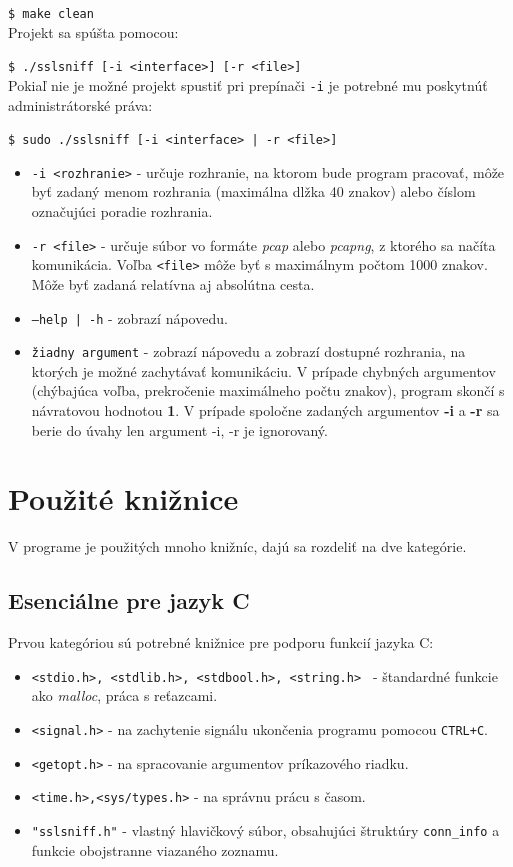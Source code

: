 \documentclass[11pt, a4paper]{article}
\begin{document}
\texttt{\$ make clean}\\
Projekt sa spúšta pomocou:

\texttt{\$ ./sslsniff [-i <interface>] [-r <file>]}\\
Pokiaľ nie je možné projekt spustiť pri prepínači \texttt{-i} je potrebné mu poskytnúť administrátorské práva:
\label{vstupne argumenty}

\texttt{\$ sudo ./sslsniff [-i <interface> | -r <file>]}\\
\begin{itemize}
\item \texttt{-i <rozhranie>} - určuje rozhranie, na ktorom bude program pracovať, môže byť zadaný menom rozhrania (maximálna dlžka 40 znakov) alebo číslom označujúci poradie rozhrania. 
\item \texttt{-r <file>} - určuje súbor vo formáte \emph{pcap} alebo \emph{pcapng}, z ktorého sa načíta komunikácia. Voľba \texttt{<file>} môže byť s maximálnym počtom 1000 znakov. Môže byť zadaná relatívna aj absolútna cesta. 
\item \texttt{--help |\,-h} - zobrazí nápovedu.
\item \texttt{žiadny argument} - zobrazí nápovedu a zobrazí dostupné rozhrania, na ktorých je možné zachytávať komunikáciu.
V prípade chybných argumentov (chýbajúca voľba, prekročenie maximálneho počtu znakov), program skončí s návratovou hodnotou \textbf{1}. 
V prípade spoločne zadaných argumentov \textbf{-i} a \textbf{-r} sa berie do úvahy len argument -i, -r je ignorovaný.
\end{itemize}
	\newpage
	\section{Použité knižnice}
	V programe je použitých mnoho knižníc, dajú sa rozdeliť na dve kategórie. 

	\subsection{Esenciálne pre jazyk C}
	Prvou kategóriou sú potrebné knižnice pre podporu funkcií jazyka C:
	\begin{itemize}
	\item \texttt{<stdio.h>, <stdlib.h>, <stdbool.h>, <string.h> } - štandardné funkcie ako \emph{malloc}, práca s reťazcami.
	\item \texttt{<signal.h>} - na zachytenie signálu ukončenia programu pomocou \texttt{CTRL+C}.
	\item \texttt{<getopt.h>} - na spracovanie argumentov príkazového riadku.
	\item	\texttt{<time.h>,<sys/types.h>} - na správnu prácu s časom.	
	\item \texttt{"sslsniff.h"} - vlastný hlavičkový súbor, obsahujúci štruktúry \texttt{conn\_info} a funkcie obojstranne viazaného zoznamu.
	\end{itemize}
\end{document}
